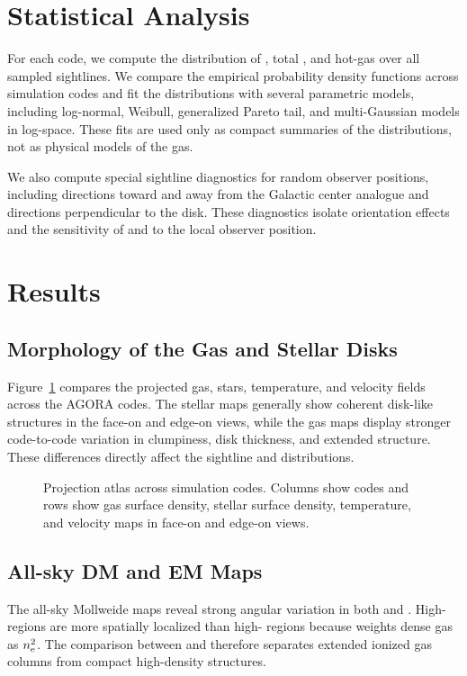 \documentclass[twocolumn]{aastex631}
\newcommand{\DM}{\mathrm{DM}}
\newcommand{\EM}{\mathrm{EM}}
\newcommand{\ne}{n_{\rm e}}
\begin{document}
\section{Statistical Analysis}\label{sec:statistics}
For each code, we compute the distribution of \DM{}, total \EM{}, and hot-gas \EM{} over all sampled sightlines.  We compare the empirical probability density functions across simulation codes and fit the \DM{} distributions with several parametric models, including log-normal, Weibull, generalized Pareto tail, and multi-Gaussian models in log-space.  These fits are used only as compact summaries of the distributions, not as physical models of the gas.

We also compute special sightline diagnostics for random observer positions, including directions toward and away from the Galactic center analogue and directions perpendicular to the disk.  These diagnostics isolate orientation effects and the sensitivity of \DM{} and \EM{} to the local observer position.

\section{Results}\label{sec:results}
\subsection{Morphology of the Gas and Stellar Disks}
Figure~\ref{fig:projection_atlas} compares the projected gas, stars, temperature, and velocity fields across the AGORA codes.  The stellar maps generally show coherent disk-like structures in the face-on and edge-on views, while the gas maps display stronger code-to-code variation in clumpiness, disk thickness, and extended structure.  These differences directly affect the sightline \DM{} and \EM{} distributions.

\begin{figure}
    \centering
    \caption{Projection atlas across simulation codes.  Columns show codes and rows show gas surface density, stellar surface density, temperature, and velocity maps in face-on and edge-on views.}
    \label{fig:projection_atlas}
\end{figure}

\subsection{All-sky DM and EM Maps}
The all-sky Mollweide maps reveal strong angular variation in both \DM{} and \EM{}.  High-\EM{} regions are more spatially localized than high-\DM{} regions because \EM{} weights dense gas as $\ne^2$.  The comparison between \DM{} and \EM{} therefore separates extended ionized gas columns from compact high-density structures.
\end{document}
